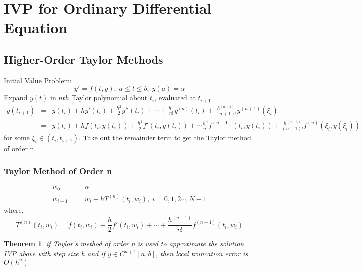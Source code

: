\documentclass[12pt]{article}
\newtheorem{theorem}{Theorem}[subsection]
\begin{document}






\section{IVP for Ordinary Differential Equation}
\subsection{Higher-Order Taylor Methods}
Initial Value Problem: $$y' = f(t,y), \; a \leq t \leq b, \; y(a) = \alpha$$
Expand $y(t)$ in $nth$ Taylor polynomial about $t_i$, evaluated at $t_{i+1}$
\begin{eqnarray*}
	y(t_{i+1}) &=& y(t_i) + hy'(t_i) + \frac{h^2}{2}y''(t_i) + \cdots + \frac{h^n}{n!}y^{(n)}(t_i) + \frac{h^{(n+1)}}{(n+1)!}y^{(n+1)}(\xi_i) \\
			   &=& y(t_i) + hf(t_i, y(t_i)) +\frac{h^2}{2}f'(t_i, y(t_i)) + \cdots \frac{h^n}{n!}f^{(n-1)}(t_i, y(t_i)) + \frac{h^{(n+1)}}{(n+1)!}f^{(n)}(\xi_i, y(\xi_i))
\end{eqnarray*}
for some $\xi_i \in (t_i, t_{i+1})$. Take out the remainder term to get the Taylor method of order n. 
\subsubsection{Taylor Method of Order n}
\begin{eqnarray*}
	w_0 	&=& \alpha \\
	w_{i+1} &=& w_i +hT^{(n)}(t_i, w_i), \; i = 0,1,2 \cdots, N-1
\end{eqnarray*}
where, $$T^{(n)}(t_i, w_i) = f(t_i,w_i) + \frac{h}{2}f'(t_i,w_i) + \cdots + \frac{h^{(n-1)}}{n!}f^{(n-1)}(t_i,w_i)$$
\begin{theorem}
	if Taylor's method of order n is used to approximate the solution IVP above with step size h and if $y \in C^{n+1}[a,b]$, then local truncation error is $O(h^n)$
\end{theorem}
\end{document}
